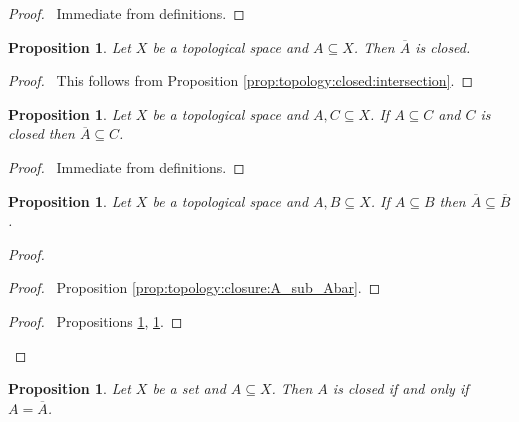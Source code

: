 \documentclass{report}
\let\qed\relax
\newtheorem{prop}[lm]{Proposition}
\theoremstyle{definition}
\begin{document}
  \begin{proof}
    \pf\ Immediate from definitions. \qed
  \end{proof}

  \begin{prop}
    \label{prop:topology:closure:closed}
    Let $X$ be a topological space and $A \subseteq X$. Then $\overline{A}$ is
    closed.
  \end{prop}

  \begin{proof}
    \pf\ This follows from Proposition \ref{prop:topology:closed:intersection}.
    \qed
  \end{proof}

  \begin{prop}
    \label{prop:topology:closure:minimal}
    Let $X$ be a topological space and $A, C \subseteq X$. If $A \subseteq C$
    and $C$ is closed then $\overline{A} \subseteq C$.
  \end{prop}

  \begin{proof}
    \pf\ Immediate from definitions. \qed
  \end{proof}

  \begin{prop}
    \label{prop:topology:closure:monotone}
    Let $X$ be a topological space and $A, B \subseteq X$. If $A \subseteq B$
    then $\overline{A} \subseteq \overline{B}$.
  \end{prop}

  \begin{proof}
    \pf
    \begin{proof}
      \pf\ Proposition \ref{prop:topology:closure:A_sub_Abar}.
    \end{proof}
    \begin{proof}
      \pf\ Propositions \ref{prop:topology:closure:closed},
      \ref{prop:topology:closure:minimal}.
    \end{proof}
    \qed
  \end{proof}

  \begin{prop}
    \label{prop:topology:closure:closed2}
    Let $X$ be a set and $A \subseteq X$. Then $A$ is closed if and only if $A
    = \overline{A}$.
  \end{prop}
\end{document}
